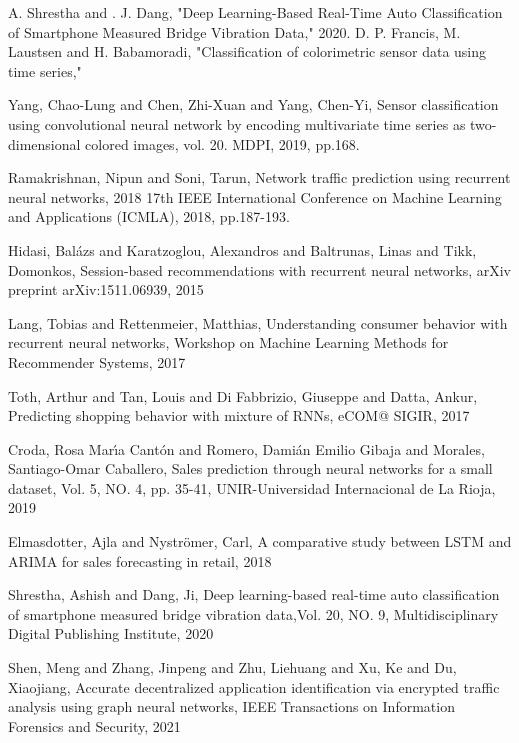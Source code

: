 \documentclass[conference]{IEEEtran}
\begin{document}
\begin{thebibliography}{00}
 A. Shrestha and . J. Dang, "Deep Learning-Based Real-Time Auto Classification of Smartphone Measured Bridge Vibration Data," 2020. 
 D. P. Francis, M. Laustsen and H. Babamoradi, "Classification of colorimetric sensor data using time series," 

 Yang, Chao-Lung and Chen, Zhi-Xuan and Yang, Chen-Yi, Sensor classification using convolutional neural network by encoding multivariate time series as two-dimensional colored images, vol. 20. MDPI, 2019, pp.168.

 Ramakrishnan, Nipun and Soni, Tarun, Network traffic prediction using recurrent neural networks, 2018 17th IEEE International Conference on Machine Learning and Applications (ICMLA), 2018, pp.187-193.

 Hidasi, Bal{\'a}zs and Karatzoglou, Alexandros and Baltrunas, Linas and Tikk, Domonkos, Session-based recommendations with recurrent neural networks, arXiv preprint arXiv:1511.06939, 2015

 Lang, Tobias and Rettenmeier, Matthias, Understanding consumer behavior with recurrent neural networks, Workshop on Machine Learning Methods for Recommender Systems, 2017
 
 Toth, Arthur and Tan, Louis and Di Fabbrizio, Giuseppe and Datta, Ankur, Predicting shopping behavior with mixture of RNNs, eCOM@ SIGIR, 2017

 Croda, Rosa Mar{\'\i}a Cant{\'o}n and Romero, Dami{\'a}n Emilio Gibaja and Morales, Santiago-Omar Caballero, Sales prediction through neural networks for a small dataset, Vol. 5, NO. 4, pp. 35-41, UNIR-Universidad Internacional de La Rioja, 2019

 Elmasdotter, Ajla and Nystr{\"o}mer, Carl, A comparative study between LSTM and ARIMA for sales forecasting in retail, 2018

 Shrestha, Ashish and Dang, Ji, Deep learning-based real-time auto classification of smartphone measured bridge vibration data,Vol. 20, NO. 9, Multidisciplinary Digital Publishing Institute, 2020

 Shen, Meng and Zhang, Jinpeng and Zhu, Liehuang and Xu, Ke and Du, Xiaojiang, Accurate decentralized application identification via encrypted traffic analysis using graph neural networks, IEEE Transactions on Information Forensics and Security, 2021

\end{thebibliography}
\end{document}
